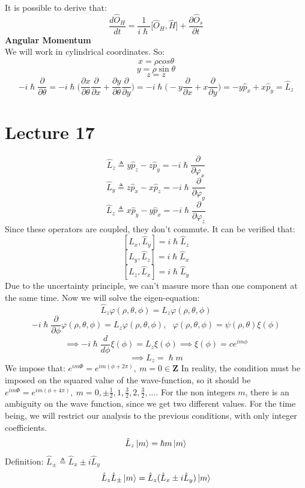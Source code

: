 \documentclass{article}
\begin{document}
It is possible to derive that:
$$\frac{d \hat{O}_H}{dt} = \frac{1}{i\hslash} \bigl[ \hat{O}_H, \hat{H} \bigl] + \frac{\partial \hat{O}_s}{\partial t}$$
\textbf{Angular Momentum} \\
We will work in cylindrical coordinates. So:
$$x= \rho cos\theta$$
$$y = \rho \sin\theta$$
$$z= z$$
$$-i \hslash \frac{\partial}{\partial \theta} = - i \hslash \biggl( \frac{\partial x}{\partial \theta} \frac{\partial}{\partial x} + \frac{\partial y}{\partial \theta} \frac{\partial}{\partial y} \biggl) = - i \hslash \biggl( -y \frac{\partial}{\partial x} + x \frac{\partial}{\partial y} \biggl) = - y \hat{p}_x + x \hat{p}_y = \hat{L}_z$$

\section{Lecture 17}
$$\hat{L}_z \triangleq y \hat{p}_z - z \hat{p}_y = - i \hslash \frac{\partial}{\partial \varphi_x}$$
$$\hat{L}_y \triangleq z \hat{p}_x - x \hat{p}_z = - i \hslash \frac{\partial}{\partial \varphi_y}$$
$$\hat{L}_z \triangleq x \hat{p}_y - y \hat{p}_x = - i \hslash \frac{\partial}{\partial \varphi_z}$$
Since these operators are coupled, they don't commute. It can be verified that:
$$[\hat{L}_x, \hat{L}_y ] = i \hslash \hat{L}_z$$
$$[ \hat{L}_y, \hat{L}_z] = i \hslash \hat{L}_x$$
$$[ \hat{L}_z, \hat{L}_x ] = i \hslash \hat{L}_y$$
Due to the uncertainty principle, we can't masure more than one component at the same time.
Now we will solve the eigen-equation:
$$\hat{L}_z \varphi(\rho,\theta,\phi) = L_z \varphi(\rho,\theta,\phi)$$
$$- i \hslash\frac{\partial}{\partial \phi} \varphi(\rho, \theta, \phi)= L_z \varphi(\rho, \theta, \phi), \ \ \  \varphi(\rho,\theta,\phi) = \psi(\rho,\theta) \xi(\phi) $$
$$\implies  -i \hslash \frac{d}{d\phi} \xi(\phi) = L_z \xi(\phi) \implies \xi(\phi) = c e^{im\phi}$$
$$ \implies L_z = \hslash m$$
We impose that: $e^{im\Phi} = e^{im(\phi + 2 \pi)}, \ m = 0 \in \mathbf{Z} $
In reality, the condition must be imposed on the squared value of the wave-function, so it should be $e^{im\Phi} = e^{im(\phi + 4 \pi)}, \ m = 0, \pm \frac{1}{2}, 1, \frac{3}{2}, 2, \frac{3}{2},...$. For the non integers $m$, there is an ambiguity on the wave function, since we get two different values. For the time being, we will restrict our analysis to the previous conditions, with only integer coefficients.
$$\hat{L}_z \ket{m} = \hslash m \ket{m} $$
Definition: $ \hat{L}_{\pm} \triangleq \hat{L}_x \pm  i \hat{L}_y$
$$\hat{L}_z \hat{L}_{\pm} \ket{m} = \hat{L}_z (\hat{L}_x \pm i \hat{L}_y) \ket{m} $$
\end{document}
